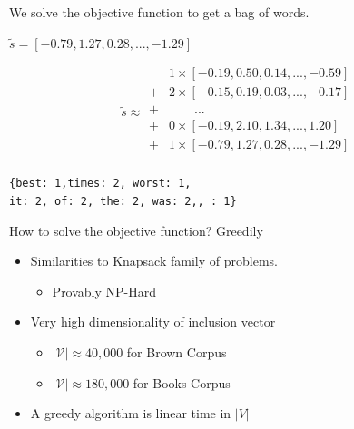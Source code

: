 \documentclass[]{beamer}
\newcommand{\iitem}[1]{\begin{itemize}
		\item #1
	\end{itemize}}
\newcommand{\s}{\tilde{s}}
\newcommand{\x}{\tilde{x}}
\newcommand{\V}{\mathcal{V}}
\newcommand{\B}{\mathcal{B}}
\begin{document}
\begin{frame}[fragile]{We solve the objective function to get a bag of words.}
	\vectorselectionproblemdefn
	\vfill
	\begin{description}
		\item<2->[Input Vector]  $\s=[−0.79, 1.27, 0.28, ..., −1.29]$
		\vfill
		\item<3->[Vector Selection] 
		\begin{equation*}
		\s \approx \begin{array}{ll}
		&1\times[−0.19, 0.50, 0.14, ..., −0.59]\\
		+&2\times[-0.15, 0.19, 0.03, ..., -0.17]\\
		+&\qquad...\\
		+&0\times[−0.19, 2.10, 1.34, ..., 1.20]\\
		+&1\times[−0.79, 1.27, 0.28, ..., −1.29]\\
		\end{array}
		\end{equation*}
		\vfill
		\item<4->[BOW] \texttt{\{best: 1,times: 2, worst: 1, \\it: 2, of: 2, the: 2, was: 2,, : 1\}}
	\end{description}
	\vfill

\end{frame}

\begin{frame}{How to solve the objective function? Greedily}
	\vectorselectionproblemdefn
		\vfill
	\begin{itemize}
		\item<1-> Similarities to Knapsack family of problems.
		\iitem{Provably NP-Hard} 
		\item<2-> Very high dimensionality of inclusion vector
		\begin{itemize}
			\item $|\V|\approx40,000$ for Brown Corpus
			\item $|\V|\approx180,000$ for Books Corpus
			\end{itemize}
		\item<3-> A greedy algorithm is linear time in $|V|$ 
	\end{itemize}
	\vfill
\end{frame}

\newcommand{\vectorselectionproblemdefnalt}{Find the bag of vectors $\B$ (a multi-subset of $\V$), such that we have  $\min d(\s,\sum_{\x_a\in\B}\x_a)$}
\end{document}
